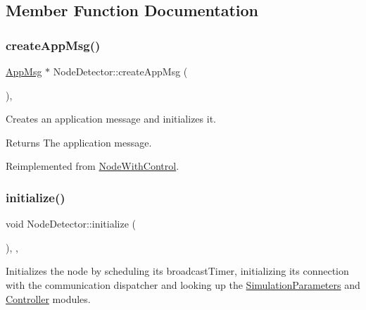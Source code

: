 \subsection{Member Function Documentation}
\mbox{\label{class_node_detector_a7100349647350ad5e3aeb1ed4669c723}} 
\subsubsection{\texorpdfstring{create\+App\+Msg()}{createAppMsg()}}
{\footnotesize\ttfamily \hyperlink{class_app_msg}{App\+Msg} $\ast$ Node\+Detector\+::create\+App\+Msg (\begin{DoxyParamCaption}{ }\end{DoxyParamCaption})\hspace{0.3cm}{\ttfamily [protected]}, {\ttfamily [virtual]}}



Creates an application message and initializes it. 

\begin{DoxyReturn}{Returns}
The application message. 
\end{DoxyReturn}


Reimplemented from \hyperlink{class_node_with_control_a7772568c2836f5f204952ebe659e0049}{Node\+With\+Control}.

\mbox{\label{class_node_detector_aefa188ab0657837b1b57f24674d3ef22}} 
\subsubsection{\texorpdfstring{initialize()}{initialize()}}
{\footnotesize\ttfamily void Node\+Detector\+::initialize (\begin{DoxyParamCaption}{ }\end{DoxyParamCaption})\hspace{0.3cm}{\ttfamily [override]}, {\ttfamily [protected]}, {\ttfamily [virtual]}}



Initializes the node by scheduling it\textquotesingle{}s broadcast\+Timer, initializing its connection with the communication dispatcher and looking up the \hyperlink{class_simulation_parameters}{Simulation\+Parameters} and \hyperlink{class_controller}{Controller} modules. 



